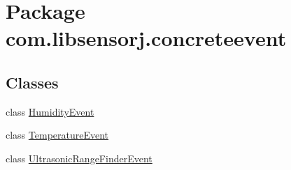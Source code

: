 \hypertarget{namespacecom_1_1libsensorj_1_1concreteevent}{}\section{Package com.\+libsensorj.\+concreteevent}
\label{namespacecom_1_1libsensorj_1_1concreteevent}
\subsection*{Classes}
\begin{DoxyCompactItemize}
\item 
class \hyperlink{classcom_1_1libsensorj_1_1concreteevent_1_1HumidityEvent}{Humidity\+Event}
\item 
class \hyperlink{classcom_1_1libsensorj_1_1concreteevent_1_1TemperatureEvent}{Temperature\+Event}
\item 
class \hyperlink{classcom_1_1libsensorj_1_1concreteevent_1_1UltrasonicRangeFinderEvent}{Ultrasonic\+Range\+Finder\+Event}
\end{DoxyCompactItemize}
